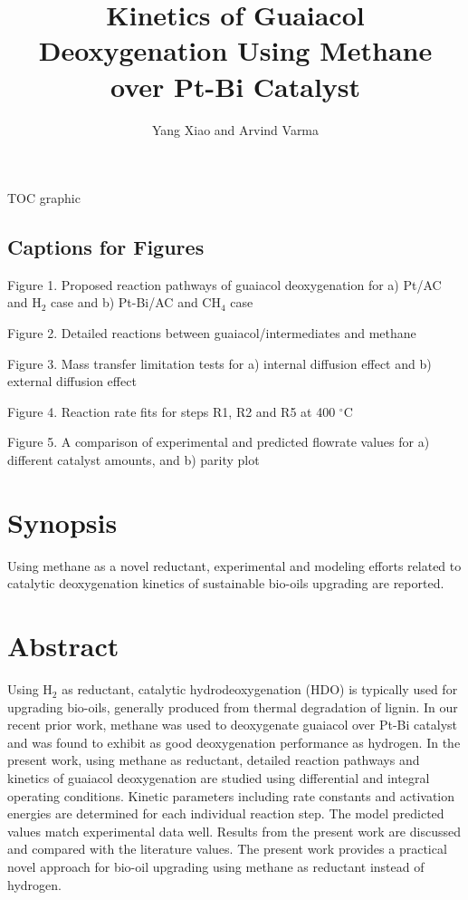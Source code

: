 \documentclass[journal=iecred,manuscript=article]{achemso}
\author{Yang Xiao and Arvind Varma}
\affiliation[Purdue University]
{School of Chemical Engineering, Purdue University, West Lafayette, IN 47907, United States}
\title[An \textsf{achemso} demo]
  {Kinetics of Guaiacol Deoxygenation Using Methane over Pt-Bi Catalyst}
\begin{document}
\newpage
TOC graphic 

\begin{center}
\epsfxsize=350pt
\end{center}

\newpage
\setlength{\parindent}{0pt}
\begin{center}

\section{Captions for Figures}
\end{center}
Figure 1. Proposed reaction pathways of guaiacol deoxygenation for a) Pt/AC and H$_{2}$ case and b) Pt-Bi/AC and CH$_{4}$ case

Figure 2. Detailed reactions between guaiacol/intermediates and methane

Figure 3. Mass transfer limitation tests for a) internal diffusion effect and b) external diffusion effect

Figure 4. Reaction rate fits for steps R1, R2 and R5 at 400 $^{\circ}$C

Figure 5. A comparison of experimental and predicted flowrate values for a) different catalyst amounts, and b) parity plot

\newpage
\setlength{\parindent}{0pt}
\section{Synopsis}
Using methane as a novel reductant, experimental and modeling efforts related to catalytic deoxygenation kinetics of sustainable bio-oils upgrading are reported.
\section{Abstract}
Using H$_2$ as reductant,
catalytic hydrodeoxygenation (HDO) is typically used for upgrading bio-oils, generally produced from thermal degradation of lignin.
In our recent prior work, methane was used to deoxygenate guaiacol over Pt-Bi catalyst
and was found to exhibit as good deoxygenation performance as hydrogen.
In the present work, using methane as reductant,
detailed reaction pathways and kinetics of guaiacol deoxygenation are studied
using differential and integral operating conditions.
Kinetic parameters including rate constants and activation energies are determined for each individual reaction step.
The model predicted values match experimental data well.
Results from the present work are discussed and compared with the literature values.
The present work provides a practical novel approach for bio-oil upgrading
using methane as reductant instead of hydrogen.
\end{document}
